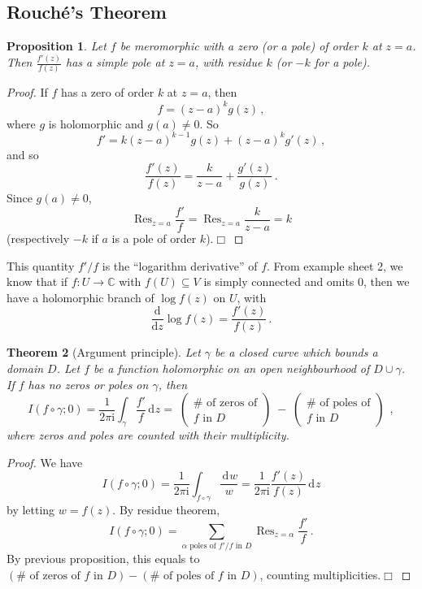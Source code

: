 \documentclass{article}
\theoremstyle{plain}\theoremheaderfont{\normalfont\itshape}\theorembodyfont{\rmfamily}\theoremseparator{.}\newtheorem*{rem}{Remark}\newtheorem*{ex}{Example}\newtheorem*{proof}{Proof}\newtheorem*{altp}{Alternative proof}\newtheorem*{con}{Consequences}\newtheorem*{notn}{Notations}\newtheorem*{cau}{Caution}\newtheorem*{term}{Terminology}\newtheorem*{keyex}{Key example}
\theoremstyle{plain}\theoremheaderfont{\normalfont\bfseries}\theorembodyfont{\rmfamily}\theoremseparator{.}\newtheorem{thm}{Theorem}[section]\newtheorem{lem}[thm]{Lemma}\newtheorem{prop}[thm]{Proposition}\newtheorem*{cor}{Corollary}\newtheorem{defn}[thm]{Definition}\newtheorem{clm}[thm]{Claim}\newtheorem{clminproof}{Claim}\newtheorem{leminproof}{Lemma}\newtheorem{app}{Application}
\theoremstyle{break}\theoremheaderfont{\normalfont\itshape}\theorembodyfont{\rmfamily}\theoremseparator{.\medskip}\newtheorem*{proofskip}{Proof}\newtheorem*{exs}{Examples}\newtheorem*{rems}{Remarks}\newtheorem*{rec}{Recall}\newtheorem*{ppts}{Properties}
\theoremstyle{break}\theoremheaderfont{\normalfont\bfseries}\theorembodyfont{\rmfamily}\theoremseparator{.\medskip}\newtheorem{lemskip}[thm]{Lemma}\newtheorem{defnskip}[thm]{Definition}\newtheorem{propskip}[thm]{Proposition}\newtheorem{thmskip}[thm]{Theorem}
\numberwithin{equation}{section}
\newcommand{\ii}{\mathrm{i}}
\DeclareMathOperator*{\Res}{Res}
\newcommand{\qed}{\hfill\ensuremath{\Box}}
\newcommand{\dd}[2][]{\,\mathrm{d}^{#1} #2}
\newcommand{\CC}{\mathbb{C}}
\newcommand{\dv}[2]{\frac{\mathrm{d}#1}{\mathrm{d}#2}}
\begin{document}
    \subsection{Rouch\'{e}'s Theorem}
    \begin{prop}
        Let \(f\) be meromorphic with a zero (or a pole) of order \(k\) at \(z=a\). Then \(\frac{f'(z)}{f(z)}\) has a simple pole at \(z=a\), with residue \(k\) (or \(-k\) for a pole).
    \end{prop}
    \begin{proof}
        If \(f\) has a zero of order \(k\) at \(z=a\), then
        \[f=(z-a)^kg(z)\,,\]
        where \(g\) is holomorphic and \(g(a)\ne 0\). So
        \[f'=k(z-a)^{k-1}g(z)+(z-a)^k g'(z)\,,\]
        and so
        \[\frac{f'(z)}{f(z)}=\frac{k}{z-a}+\frac{g'(z)}{g(z)}\,.\]
        Since \(g(a)\ne 0\),
        \[\Res_{z=a}\frac{f'}{f}=\Res_{z=a}\frac{k}{z-a}=k\]
        (respectively \(-k\) if \(a\) is a pole of order \(k\)).\qed
    \end{proof}
    This quantity \(f'/f\) is the ``logarithm derivative'' of \(f\). From example sheet 2, we know that if \(f:U\to\CC\) with \(f(U)\subseteq V\) is simply connected and omits 0, then we have a holomorphic branch of \(\log f(z)\) on \(U\), with
    \[\dv{}{z}\log f(z)=\frac{f'(z)}{f(z)}\,.\]
    \begin{thm}[Argument principle]
        Let \(\gamma\) be a closed curve which bounds a domain \(D\). Let \(f\) be a function holomorphic on an open neighbourhood of \(D\cup\gamma\). If \(f\) has no zeros or poles on \(\gamma\), then
        \[I(f\circ\gamma;0)=\frac{1}{2\pi \ii}\int_\gamma\frac{f'}{f}\dd{z}=\;\begin{pmatrix}
            \#\text{ of zeros of} \\ f\text{ in }D
        \end{pmatrix}\;-\;\begin{pmatrix}
            \#\text{ of poles of} \\ f\text{ in }D
        \end{pmatrix}\;\,,\]
        where zeros and poles are counted with their multiplicity.
    \end{thm}
    \begin{proof}
        We have
        \[I(f\circ\gamma;0)=\frac{1}{2\pi \ii}\int_{f\circ\gamma}\frac{\dd{w}}{w}=\frac{1}{2\pi \ii}\frac{f'(z)}{f(z)}\dd{z}\]
        by letting \(w=f(z)\). By residue theorem,
        \[I(f\circ\gamma;0)=\sum_{\alpha\text{ poles of }f'/f\text{ in }D}\Res_{z=\alpha}\frac{f'}{f}\,.\]
        By previous proposition, this equals to \((\#\text{ of zeros of }f\text{ in }D)-(\#\text{ of poles of }f\text{ in }D)\), counting multiplicities.\qed
    \end{proof}
\end{document}
